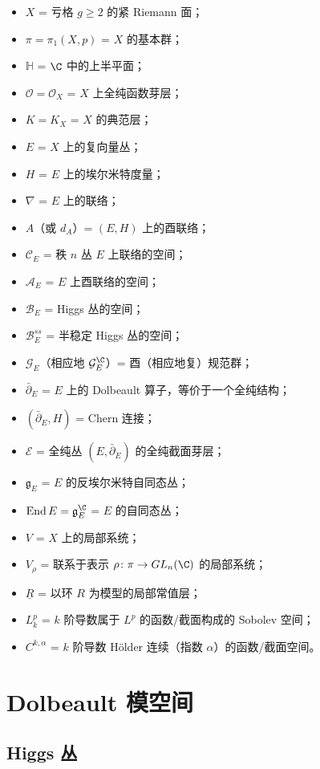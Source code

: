 \begin{itemize}[leftmargin=1.6em, itemsep=0.15em]
\item $X$ = 亏格 $g\ge2$ 的紧 Riemann 面；
\item $\pi=\pi_1(X,p)$ = $X$ 的基本群；
\item $\mathbb{H}$ = $\C$ 中的上半平面；
\item $\mathcal{O}=\mathcal{O}_X$ = $X$ 上全纯函数芽层；
\item $K=K_X$ = $X$ 的典范层；
\item $E$ = $X$ 上的复向量丛；
\item $H$ = $E$ 上的埃尔米特度量；
\item $\nabla$ = $E$ 上的联络；
\item $A$（或 $d_A$）= $(E,H)$ 上的酉联络；
\item $\mathcal{C}_E$ = 秩 $n$ 丛 $E$ 上联络的空间；
\item $\mathcal{A}_E$ = $E$ 上酉联络的空间；
\item $\mathcal{B}_E$ = Higgs 丛的空间；
\item $\mathcal{B}^{ss}_E$ = 半稳定 Higgs 丛的空间；
\item $\mathcal{G}_E$（相应地 $\mathcal{G}_E^\C$）= 酉（相应地复）规范群；
\item $\bar\partial_E$ = $E$ 上的 Dolbeault 算子，等价于一个全纯结构；
\item $(\bar\partial_E,H)$ = Chern 连接；
\item $\mathcal{E}$ = 全纯丛 $(E,\bar\partial_E)$ 的全纯截面芽层；
\item $\mathfrak{g}_E$ = $E$ 的反埃尔米特自同态丛；
\item $\operatorname{End}E=\mathfrak{g}^\C_E$ = $E$ 的自同态丛；
\item $V$ = $X$ 上的局部系统；
\item $V_\rho$ = 联系于表示 $\rho\colon\pi\to GL_n(\C)$ 的局部系统；
\item $\underline{R}$ = 以环 $R$ 为模型的局部常值层；
\item $L^p_k$ = $k$ 阶导数属于 $L^p$ 的函数/截面构成的 Sobolev 空间；
\item $C^{k,\alpha}$ = $k$ 阶导数 H\"older 连续（指数 $\alpha$）的函数/截面空间。
\end{itemize}

\section{Dolbeault 模空间}

\subsection{Higgs 丛}

